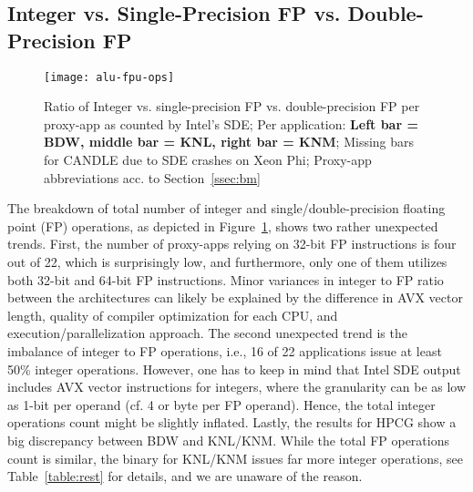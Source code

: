 \subsection{Integer vs. Single-Precision FP vs. Double-Precision FP}\label{ssec:eval_ops}
%
\begin{figure}[tbp]
    \centering
    \texttt{[image: alu-fpu-ops]}
    \caption{\label{fig:totalops} Ratio of Integer vs. single-precision FP vs. double-precision FP per proxy-app as counted by Intel's SDE; Per application: \textbf{Left bar = BDW, middle bar = KNL, right bar = KNM}; Missing bars for CANDLE due to SDE crashes on Xeon Phi; Proxy-app abbreviations acc. to Section~\ref{ssec:bm}}
\end{figure}
%
The breakdown of total number of integer and single/double-precision floating point (FP) operations, as depicted in Figure~\ref{fig:totalops},
shows two rather unexpected trends. First, the number of proxy-apps relying on 32-bit FP instructions is four out of 22, which is surprisingly low, and furthermore, only one of them utilizes both 32-bit and 64-bit FP instructions.
Minor variances in integer to FP ratio between the architectures can likely be explained by the difference in
AVX vector length, quality of compiler optimization for each CPU, and execution/parallelization approach.
The second unexpected trend is the imbalance of integer to FP operations, i.e., 16 of 22 applications issue at least 50\%
integer operations. However, one has to keep in mind that Intel SDE output includes AVX vector instructions for integers, where
the granularity can be as low as 1-bit per operand (cf. 4 or \unit[8]{byte} per FP operand). Hence, the total integer operations
count might be slightly inflated.
Lastly, the results for HPCG show a big discrepancy between BDW and KNL/KNM. While the total FP operations count is similar,
the binary for KNL/KNM issues far more integer operations, see Table~\ref{table:rest} for details, and we are unaware of the reason.

